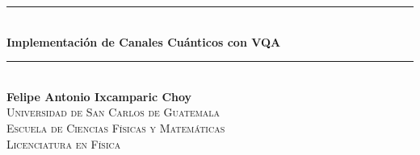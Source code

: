 \documentclass[11pt, spanish, letterpage]{report} %
\date{}
\newcommand{\1}{\mathbb{1}}
\begin{document}
\begin{titlepage} %
\newcommand{\HRule}{\rule{\linewidth}{0.5mm}} %

\center %

	
\HRule\\[0.6cm]

{\huge\bfseries Implementación de Canales Cuánticos con VQA}\\[0.5cm] %

\HRule\\[2cm]



\Large{\textbf{Felipe Antonio Ixcamparic Choy}}\\ [2cm] %


\textsc{\LARGE Universidad de San Carlos de Guatemala\\ Escuela de Ciencias Físicas y Matemáticas\\ Licenciatura en Física}\\[2cm]



\end{titlepage}
\end{document}
